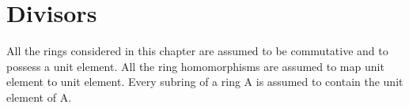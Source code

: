 \chapter{Divisors}

All the rings considered in this chapter are assumed to be commutative and to possess a unit element. All the ring homomorphisms are assumed to map unit element to unit element. Every subring of a ring A is assumed to contain the unit element of A.

